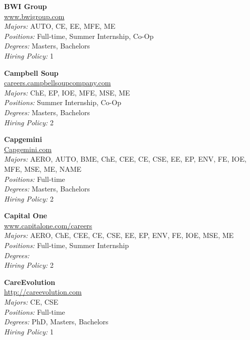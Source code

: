 \documentclass[twoside]{article}
\begin{document}
\begin{center}
\begin{multicols}{3}
\begin{minipage}{.9\columnwidth}{\Large\bf BWI Group }\\
	\url{www.bwigroup.com}\\
	\emph{Majors:} AUTO, CE, EE, MFE, ME\\
	\emph{Positions:} Full-time, Summer Internship, Co-Op\\
	\emph{Degrees:} Masters, Bachelors\\
	\emph{Hiring Policy:} 1\\
\end{minipage}
 
\begin{minipage}{.9\columnwidth}{\Large\bf Campbell Soup }\\
	\url{careers.campbellsoupcompany.com}\\
	\emph{Majors:} ChE, EP, IOE, MFE, MSE, ME\\
	\emph{Positions:} Summer Internship, Co-Op\\
	\emph{Degrees:} Masters, Bachelors\\
	\emph{Hiring Policy:} 2\\
\end{minipage}
 
\begin{minipage}{.9\columnwidth}{\Large\bf Capgemini }\\
	\url{Capgemini.com}\\
	\emph{Majors:} AERO, AUTO, BME, ChE, CEE, CE, CSE, EE, EP, ENV, FE, IOE, MFE, MSE, ME, NAME\\
	\emph{Positions:} Full-time\\
	\emph{Degrees:} Masters, Bachelors\\
	\emph{Hiring Policy:} 2\\
\end{minipage}
 
\begin{minipage}{.9\columnwidth}{\Large\bf Capital One }\\
	\url{www.capitalone.com/careers}\\
	\emph{Majors:} AERO, ChE, CEE, CE, CSE, EE, EP, ENV, FE, IOE, MSE, ME\\
	\emph{Positions:} Full-time, Summer Internship\\
	\emph{Degrees:} \\
	\emph{Hiring Policy:} 2\\
\end{minipage}
 
\begin{minipage}{.9\columnwidth}{\Large\bf CareEvolution }\\
	\url{http://careevolution.com}\\
	\emph{Majors:} CE, CSE\\
	\emph{Positions:} Full-time\\
	\emph{Degrees:} PhD, Masters, Bachelors\\
	\emph{Hiring Policy:} 1\\
\end{minipage}
 

\end{multicols}
\end{center}
\end{document}
